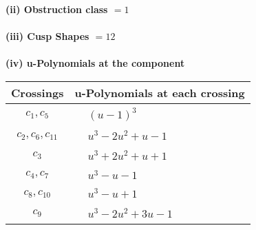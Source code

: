 \documentclass[1p]{elsarticle_modified}
\theoremstyle{definition}
\begin{document}
\flushleft \textbf{(ii) Obstruction class $= 1$}\\~\\
\flushleft \textbf{(iii) Cusp Shapes $= 12$}\\~\\
\newpage\renewcommand{\arraystretch}{1}
\flushleft \textbf{(iv) u-Polynomials at the component}\newline \\
\begin{tabular}{m{50pt}|m{274pt}}
Crossings & \hspace{64pt}u-Polynomials at each crossing \\
\hline $$\begin{aligned}c_{1},c_{5}\end{aligned}$$&$\begin{aligned}
&(u-1)^3
\end{aligned}$\\
\hline $$\begin{aligned}c_{2},c_{6},c_{11}\end{aligned}$$&$\begin{aligned}
&u^3-2 u^2+u-1
\end{aligned}$\\
\hline $$\begin{aligned}c_{3}\end{aligned}$$&$\begin{aligned}
&u^3+2 u^2+u+1
\end{aligned}$\\
\hline $$\begin{aligned}c_{4},c_{7}\end{aligned}$$&$\begin{aligned}
&u^3- u-1
\end{aligned}$\\
\hline $$\begin{aligned}c_{8},c_{10}\end{aligned}$$&$\begin{aligned}
&u^3- u+1
\end{aligned}$\\
\hline $$\begin{aligned}c_{9}\end{aligned}$$&$\begin{aligned}
&u^3-2 u^2+3 u-1
\end{aligned}$\\
\hline
\end{tabular}\\~\\
\newpage\renewcommand{\arraystretch}{1}
\end{document}
